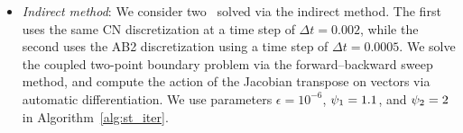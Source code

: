 \begin{itemize}
\begin{itemize}
\item \textit{Indirect method}: We consider two \methodAcronymROMs\ solved via the indirect method. The first uses the same CN discretization at a time step of $\Delta t = 0.002$, while the second uses the AB2 discretization using a time step of $\Delta t = 0.0005$. We solve the coupled two-point boundary 
problem via the forward--backward sweep method, and compute the action of the Jacobian transpose on vectors via automatic differentiation. We use parameters $\epsilon = 10^{-6}$, $\psi_1 = 1.1$, and $\psi_2=2$ in Algorithm~\ref{alg:st_iter}. 
\end{itemize}
\end{itemize}

%



